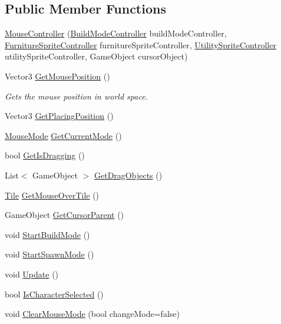 \subsection*{Public Member Functions}
\begin{DoxyCompactItemize}
\item 
\hyperlink{class_mouse_controller_a94346c229fc62e5f63bcb737181fa946}{Mouse\+Controller} (\hyperlink{class_build_mode_controller}{Build\+Mode\+Controller} build\+Mode\+Controller, \hyperlink{class_furniture_sprite_controller}{Furniture\+Sprite\+Controller} furniture\+Sprite\+Controller, \hyperlink{class_utility_sprite_controller}{Utility\+Sprite\+Controller} utility\+Sprite\+Controller, Game\+Object cursor\+Object)
\item 
Vector3 \hyperlink{class_mouse_controller_ad6ab2c64fc9448c083bba1dcc834a642}{Get\+Mouse\+Position} ()
\begin{DoxyCompactList}\small\item\em Gets the mouse position in world space. \end{DoxyCompactList}\item 
Vector3 \hyperlink{class_mouse_controller_a15de1e155c9b78d28df606af2d6817dd}{Get\+Placing\+Position} ()
\item 
\hyperlink{class_mouse_controller_aa9b016ba73cc945841e3fae192330a51}{Mouse\+Mode} \hyperlink{class_mouse_controller_afebdeed6462eccd639e5799851597c14}{Get\+Current\+Mode} ()
\item 
bool \hyperlink{class_mouse_controller_a1cc8e4525f57977037f3cae9e70327ab}{Get\+Is\+Dragging} ()
\item 
List$<$ Game\+Object $>$ \hyperlink{class_mouse_controller_a8afd7ab9fc2d9768228c59250f27c3f8}{Get\+Drag\+Objects} ()
\item 
\hyperlink{class_tile}{Tile} \hyperlink{class_mouse_controller_a47ce689ad82385d2fdc959cfca34c6b5}{Get\+Mouse\+Over\+Tile} ()
\item 
Game\+Object \hyperlink{class_mouse_controller_aa4c2fcaf3a053b691fec75a34d93b5c4}{Get\+Cursor\+Parent} ()
\item 
void \hyperlink{class_mouse_controller_aa38db8a75d9e6875bbc574588b26ac41}{Start\+Build\+Mode} ()
\item 
void \hyperlink{class_mouse_controller_a99a99423977b205150b7f05a2701f581}{Start\+Spawn\+Mode} ()
\item 
void \hyperlink{class_mouse_controller_ac9b2f0fae750d7128123db59fe99c6d5}{Update} ()
\item 
bool \hyperlink{class_mouse_controller_a3ef7887060eaa7a7320c5432a395e923}{Is\+Character\+Selected} ()
\item 
void \hyperlink{class_mouse_controller_ad4712d93dd933c64427391b9789b3d99}{Clear\+Mouse\+Mode} (bool change\+Mode=false)
\end{DoxyCompactItemize}
